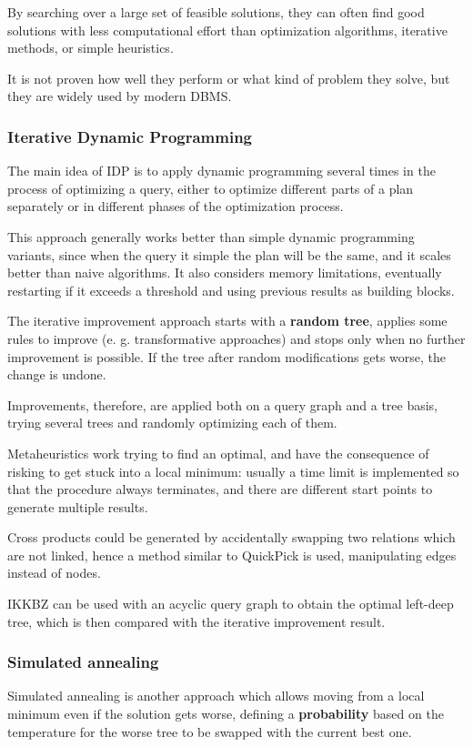By searching over a large set of feasible solutions, they can often find good solutions with less computational effort than optimization algorithms, iterative methods, or simple heuristics.

It is not proven how well they perform or what kind of problem they solve, but they are widely used by modern DBMS.

\subsubsection{Iterative Dynamic Programming}
The main idea of IDP is to apply dynamic programming several times
in the process of optimizing a query, either to optimize different parts of a plan
separately or in different phases of the optimization process.

This approach generally works better than simple dynamic programming variants, since when the query it simple the plan will be the same, and it scales better than naive algorithms. It also considers memory limitations, eventually restarting if it exceeds a threshold and using previous results as building blocks. 

The iterative improvement approach starts with a \textbf{random tree}, applies some rules to improve (e. g. transformative approaches) and stops only when no further improvement is possible. If the tree after random modifications gets worse, the change is undone. 

Improvements, therefore, are applied both on a query graph and a tree basis, trying several trees and randomly optimizing each of them.

Metaheuristics work trying to find an optimal, and have the consequence of risking to get stuck into a local minimum: usually a time limit is implemented so that the procedure always terminates, and there are different start points to generate multiple results.

Cross products could be generated by accidentally swapping two relations which are not linked, hence a method similar to QuickPick is used, manipulating edges instead of nodes.

IKKBZ can be used with an acyclic query graph to obtain the optimal left-deep tree, which is then compared with the iterative improvement result.

\subsubsection{Simulated annealing}
Simulated annealing is another approach which allows moving from a local minimum even if the solution gets worse, defining a \textbf{probability} based on the temperature for the worse tree to be swapped with the current best one. 

